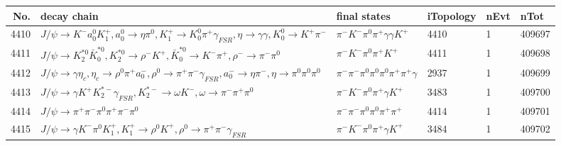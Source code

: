 \begin{table}[htbp] 
\begin{center}
\begin{small}
\begin{tabular}{rlllll}\hline\hline
 No. & decay chain & final states &  iTopology & nEvt & nTot \\\hline
4410&$J/\psi       \rightarrow K^{-}          a_{0}^{0}      K_1^{+}        , a_{0}^{0}       \rightarrow \eta          \pi^{0}        , K_1^{+}         \rightarrow K_0^{0}        \pi^{+}        \gamma_{FSR} , \eta           \rightarrow \gamma       \gamma       , K_0^{0}         \rightarrow K^{+}          \pi^{-}        $&$\pi^{-}        K^{-}          \pi^{0}        \pi^{+}        \gamma       \gamma       K^{+}          $& 4410&    1&409697\\
4411&$J/\psi       \rightarrow K_2^{*0}       \bar{K}_0^{*0}, K_2^{*0}        \rightarrow \rho^{-}      K^{+}          , \bar{K}_0^{*0} \rightarrow K^{-}          \pi^{+}        , \rho^{-}       \rightarrow \pi^{-}        \pi^{0}        $&$\pi^{-}        K^{-}          \pi^{0}        \pi^{+}        K^{+}          $& 4411&    1&409698\\
4412&$J/\psi       \rightarrow \gamma       \eta_{c}    , \eta_{c}     \rightarrow \rho^{0}      \pi^{+}        a_{0}^{-}      , \rho^{0}       \rightarrow \pi^{+}        \pi^{-}        \gamma_{FSR} , a_{0}^{-}       \rightarrow \eta          \pi^{-}        , \eta           \rightarrow \pi^{0}        \pi^{0}        \pi^{0}        $&$\pi^{-}        \pi^{-}        \pi^{0}        \pi^{0}        \pi^{0}        \pi^{+}        \pi^{+}        \gamma       $& 2937&    1&409699\\
4413&$J/\psi       \rightarrow \gamma       K^{+}          K_2^{*-}       \gamma_{FSR} , K_2^{*-}        \rightarrow \omega         K^{-}          , \omega          \rightarrow \pi^{-}        \pi^{+}        \pi^{0}        $&$\pi^{-}        K^{-}          \pi^{0}        \pi^{+}        \gamma       K^{+}          $& 3483&    1&409700\\
4414&$J/\psi       \rightarrow \pi^{+}        \pi^{-}        \pi^{0}        \pi^{+}        \pi^{-}        \pi^{0}        $&$\pi^{-}        \pi^{-}        \pi^{0}        \pi^{0}        \pi^{+}        \pi^{+}        $& 4414&    1&409701\\
4415&$J/\psi       \rightarrow \gamma       K^{-}          \pi^{0}        K_1^{+}        , K_1^{+}         \rightarrow \rho^{0}      K^{+}          , \rho^{0}       \rightarrow \pi^{+}        \pi^{-}        \gamma_{FSR} $&$\pi^{-}        K^{-}          \pi^{0}        \pi^{+}        \gamma       K^{+}          $& 3484&    1&409702\\

\end{tabular}
\end{small}
\end{center}
\end{table}
